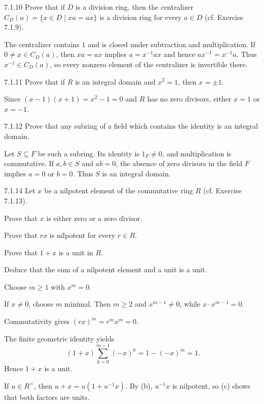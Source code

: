 \documentclass[11pt,oneside]{article}
\begin{document}
\begin{exercise}{7.1.10}
Prove that if $D$ is a division ring, then the centralizer $C_D(a)=\{x\in D\mid xa=ax\}$ is a division ring for every $a\in D$ (cf. Exercise 7.1.9).
\end{exercise}
\begin{solution}
The centralizer contains $1$ and is closed under subtraction and multiplication. If $0\ne x\in C_D(a)$, then $xa=ax$ implies $a=x^{-1}ax$ and hence $ax^{-1}=x^{-1}a$. Thus $x^{-1}\in C_D(a)$, so every nonzero element of the centralizer is invertible there.
\end{solution}

\begin{exercise}{7.1.11}
Prove that if $R$ is an integral domain and $x^2=1$, then $x=\pm1$.
\end{exercise}
\begin{solution}
Since $(x-1)(x+1)=x^2-1=0$ and $R$ has no zero divisors, either $x=1$ or $x=-1$.
\end{solution}

\begin{exercise}{7.1.12}
Prove that any subring of a field which contains the identity is an integral domain.
\end{exercise}
\begin{solution}
Let $S\subseteq F$ be such a subring. Its identity is $1_F\ne0$, and multiplication is commutative. If $a,b\in S$ and $ab=0$, the absence of zero divisors in the field $F$ implies $a=0$ or $b=0$. Thus $S$ is an integral domain.
\end{solution}

\begin{exercise}{7.1.14}
Let $x$ be a nilpotent element of the commutative ring $R$ (cf. Exercise 7.1.13).
\begin{exercisesubparts}
\item Prove that $x$ is either zero or a zero divisor.
\item Prove that $rx$ is nilpotent for every $r\in R$.
\item Prove that $1+x$ is a unit in $R$.
\item Deduce that the sum of a nilpotent element and a unit is a unit.
\end{exercisesubparts}
\end{exercise}
\begin{solution}
Choose $m\ge1$ with $x^m=0$.
\begin{exercisesubparts}
\item If $x\ne0$, choose $m$ minimal. Then $m\ge2$ and $x^{m-1}\ne0$, while $x\cdot x^{m-1}=0$.
\item Commutativity gives $(rx)^m=r^mx^m=0$.
\item The finite geometric identity yields
\[
(1+x)\sum_{k=0}^{m-1}(-x)^k=1-(-x)^m=1.
\]
Hence $1+x$ is a unit.
\item If $u\in R^\times$, then $u+x=u(1+u^{-1}x)$. By (b), $u^{-1}x$ is nilpotent, so (c) shows that both factors are units.
\end{exercisesubparts}
\end{solution}
\end{document}
